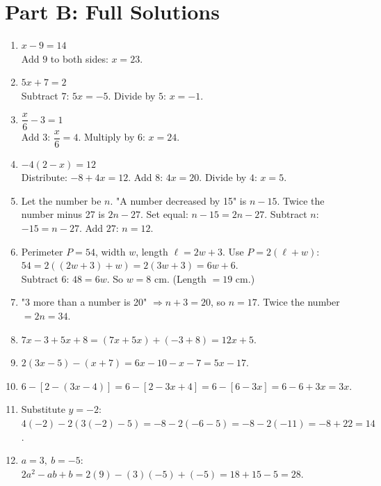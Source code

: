 \documentclass[11pt]{article}
\begin{document}
\newpage
\section*{Part B: Full Solutions}
\label{sec:solutions}
\begin{enumerate}
\item $x - 9 = 14$ \\ Add $9$ to both sides: $x = 23$.

\item $5x + 7 = 2$ \\ Subtract $7$: $5x = -5$. Divide by $5$: $x = -1$.

\item $\dfrac{x}{6} - 3 = 1$ \\ Add $3$: $\dfrac{x}{6} = 4$. Multiply by $6$: $x = 24$.

\item $-4(2 - x) = 12$ \\ Distribute: $-8 + 4x = 12$. Add $8$: $4x = 20$. Divide by $4$: $x = 5$.

\item Let the number be $n$. "A number decreased by 15" is $n - 15$. Twice the number minus 27 is $2n - 27$. Set equal: $n - 15 = 2n - 27$. Subtract $n$: $-15 = n - 27$. Add $27$: $n = 12$.

\item Perimeter $P = 54$, width $w$, length $\ell = 2w + 3$. Use $P = 2(\ell + w)$: 
\\ $54 = 2((2w+3) + w) = 2(3w + 3) = 6w + 6$. \\ Subtract $6$: $48 = 6w$. So $w = 8$ cm. (Length $= 19$ cm.)

\item "3 more than a number is 20" $\Rightarrow n + 3 = 20$, so $n = 17$. Twice the number $= 2n = 34$.

\item $7x - 3 + 5x + 8 = (7x + 5x) + (-3 + 8) = 12x + 5$.

\item $2(3x - 5) - (x + 7) = 6x - 10 - x - 7 = 5x - 17$.

\item $6 - [2 - (3x - 4)] = 6 - [2 - 3x + 4] = 6 - [6 - 3x] = 6 - 6 + 3x = 3x$.

\item Substitute $y=-2$: $4(-2) - 2(3(-2) - 5) = -8 - 2(-6 - 5) = -8 - 2(-11) = -8 + 22 = 14$.

\item $a=3,\ b=-5$: $2a^2 - ab + b = 2(9) - (3)(-5) + (-5) = 18 + 15 - 5 = 28$.


\end{enumerate}
\end{document}
